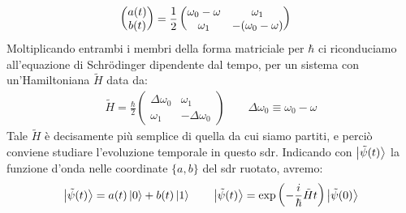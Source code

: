 \documentclass[../../InformazioneQuantistica.tex]{subfiles}
\begin{document}
\begin{enumerate}
\begin{align*}
\begin{pmatrix}
a(t)\\b(t)\end{pmatrix}=\frac{1}{2}\begin{pmatrix}
\omega_0-\omega & \omega_1\\
\omega_1 & - (\omega_0-\omega)
\end{pmatrix}
\span
\end{align*}
Moltiplicando entrambi i membri della forma matriciale per $\hbar$ ci riconduciamo all'equazione di Schr\"odinger dipendente dal tempo, per un sistema con un'Hamiltoniana $\tilde{H}$ data da:
\begin{align}
\tilde{H} = \frac{\hbar}{2}\begin{pmatrix}
\Delta \omega_0 & \omega_1\\
\omega_1 & -\Delta \omega_0 \end{pmatrix} \qquad \Delta \omega_0 \equiv \omega_0-\omega
\label{eqn:H-tilda}
\end{align}
Tale $\tilde{H}$ è decisamente più semplice di quella da cui siamo partiti, e perciò conviene studiare l'evoluzione temporale in questo sdr. Indicando con $\Ket{\tilde{\psi}(t)}$ la funzione d'onda nelle coordinate $\{a,b\}$ del sdr ruotato, avremo:
\begin{align}
\Ket{\tilde{\psi}(t)} = a(t) \Ket{0} + b(t) \Ket{1} \qquad \Ket{\tilde{\psi}(t)} = \exp\left(-\frac{i}{\hbar}\tilde{H}t\right)\Ket{\tilde{\psi}(0)}
\label{eqn:generic-rotated-psi}
\end{align}


\end{enumerate}
\end{document}
